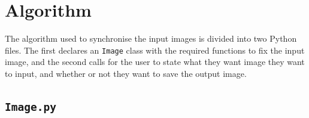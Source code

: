 \documentclass[a4paper,12pt]{article}
\begin{document}
\newpage

\appendix

\section{Algorithm}

The algorithm used to synchronise the input images is divided into two Python files. The first declares an \texttt{Image} class with the required functions to fix the input image, and the second calls for the user to state what they want image they want to input, and whether or not they want to save the output image. 

\subsection{\texttt{Image.py}}



\newpage



\end{document}
